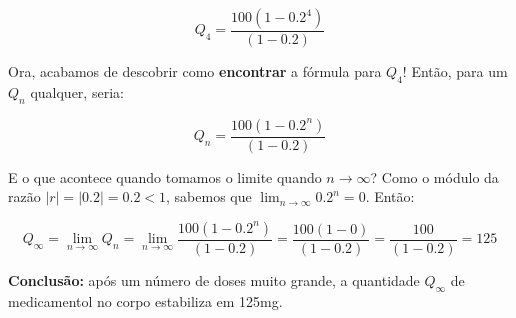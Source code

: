 \documentclass[a4paper]{article}
\begin{document}
\begin{displaymath}
  Q_4 = \frac{100(1-0.2^4)}{(1-0.2)}
\end{displaymath}

Ora, acabamos de descobrir como {\bf encontrar} a fórmula para $Q_4$!
Então, para um $Q_n$ qualquer, seria:

\begin{displaymath}
  Q_n = \frac{100(1-0.2^n)}{(1-0.2)}
\end{displaymath}

E o que acontece quando tomamos o limite quando $n\rightarrow \infty$?
Como o módulo da razão $|r| = |0.2| = 0.2 <1$, sabemos que
$\lim_{n\rightarrow\infty}0.2^n=0$. Então:

\begin{displaymath}
  Q_\infty = \lim_{n\rightarrow\infty} Q_n =
  \lim_{n\rightarrow\infty}\frac{100(1-0.2^n)}{(1-0.2)} = \frac{100(1-0)}{(1-0.2)}=\frac{100}{(1-0.2)}=125
\end{displaymath}

{\bf Conclusão:} após um número de doses muito grande, a quantidade
$Q_\infty$ de medicamentol no corpo estabiliza em 125mg.
\end{document}
